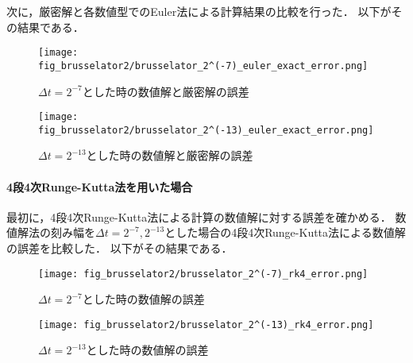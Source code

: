 次に，厳密解と各数値型でのEuler法による計算結果の比較を行った．
以下がその結果である．\\
\begin{figure}[H]
    \centering
    \begin{minipage}[b]{0.49\columnwidth}
        \centering
        \texttt{[image: fig\_brusselator2/brusselator\_2^(-7)\_euler\_exact\_error.png]}
        \caption{$\Delta t = 2^{-7}$とした時の数値解と厳密解の誤差}
        \label{fig:brusselator_2^(-7)_euler_exact_error}
    \end{minipage}
    \begin{minipage}[b]{0.49\columnwidth}
        \centering
        \texttt{[image: fig\_brusselator2/brusselator\_2^(-13)\_euler\_exact\_error.png]}
        \caption{$\Delta t =  2^{-13}$とした時の数値解と厳密解の誤差}
        \label{fig:brusselator_2^(-13)_euler_exact_error}
    \end{minipage}
\end{figure}



\paragraph*{4段4次Runge-Kutta法を用いた場合}
最初に，4段4次Runge-Kutta法による計算の数値解に対する誤差を確かめる．
数値解法の刻み幅を$\Delta t = 2^{-7},2^{-13}$とした場合の4段4次Runge-Kutta法による数値解の誤差を比較した．
以下がその結果である．
\begin{figure}[H]
    \centering
    \begin{minipage}[b]{0.49\columnwidth}
        \centering
        \texttt{[image: fig\_brusselator2/brusselator\_2^(-7)\_rk4\_error.png]}
        \caption{$\Delta t = 2^{-7}$とした時の数値解の誤差}
        \label{fig:brusselator_2^(-7)_rk4_error}
    \end{minipage}
    \begin{minipage}[b]{0.49\columnwidth}
        \centering
        \texttt{[image: fig\_brusselator2/brusselator\_2^(-13)\_rk4\_error.png]}
        \caption{$\Delta t =  2^{-13}$とした時の数値解の誤差}
        \label{fig:brusselator_2^(-13)_rk4_error}
    \end{minipage}
\end{figure}

